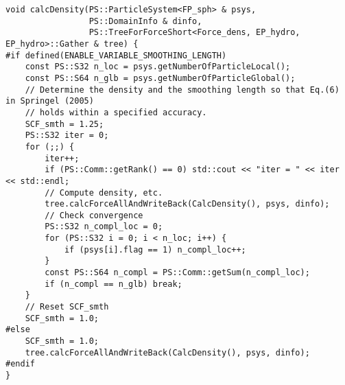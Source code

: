\ifCpp %
\begin{lstlisting}[caption=Function \texttt{calcDensity}]
void calcDensity(PS::ParticleSystem<FP_sph> & psys,
                 PS::DomainInfo & dinfo,
                 PS::TreeForForceShort<Force_dens, EP_hydro, EP_hydro>::Gather & tree) {
#if defined(ENABLE_VARIABLE_SMOOTHING_LENGTH)
    const PS::S32 n_loc = psys.getNumberOfParticleLocal();
    const PS::S64 n_glb = psys.getNumberOfParticleGlobal();
    // Determine the density and the smoothing length so that Eq.(6) in Springel (2005)
    // holds within a specified accuracy.
    SCF_smth = 1.25;
    PS::S32 iter = 0;
    for (;;) {
        iter++;
        if (PS::Comm::getRank() == 0) std::cout << "iter = " << iter << std::endl;
        // Compute density, etc.
        tree.calcForceAllAndWriteBack(CalcDensity(), psys, dinfo);
        // Check convergence
        PS::S32 n_compl_loc = 0;
        for (PS::S32 i = 0; i < n_loc; i++) {
            if (psys[i].flag == 1) n_compl_loc++;
        }
        const PS::S64 n_compl = PS::Comm::getSum(n_compl_loc);
        if (n_compl == n_glb) break;
    }
    // Reset SCF_smth
    SCF_smth = 1.0;
#else
    SCF_smth = 1.0;
    tree.calcForceAllAndWriteBack(CalcDensity(), psys, dinfo);
#endif
}
\end{lstlisting}
\endifCpp
\ifFtn %
